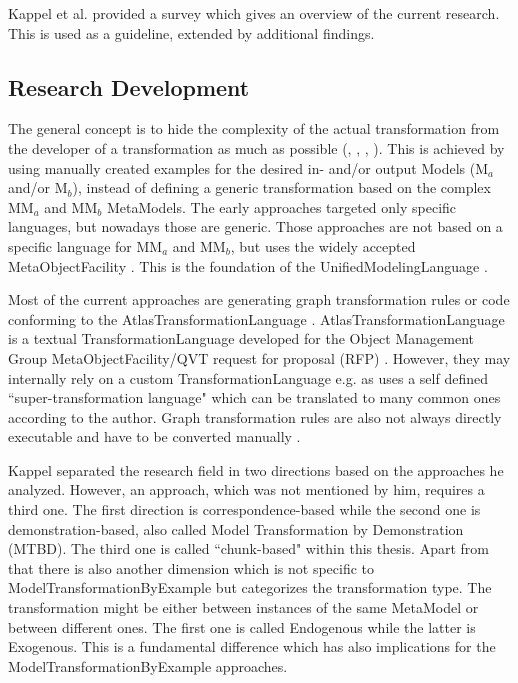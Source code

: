 Kappel et al. \cite{Kappel2012} provided a survey which gives an overview of the current research. This is used as a guideline, extended by additional findings.

\subsection{Research Development}


The general concept is to hide the complexity of the actual transformation from the developer of a transformation as much as possible (\cite{Zloof1977}, \cite{Island1987}, \cite{Krishnamurthi2000}, \cite{Kappel2012}). This is achieved by using manually created examples for the desired in- and/or output \glspl{Model} (M$_a$ and/or M$_b$), instead of defining a generic transformation based on the complex MM$_a$ and MM$_b$ \glspl{MetaModel}. The early approaches targeted only specific languages, but nowadays those are generic. Those approaches are not based on a specific language for MM$_a$ and MM$_b$, but uses the widely accepted \gls{MetaObjectFacility} \cite{ObjectManagementGroup2013}. This is the foundation of the \gls{UnifiedModelingLanguage} \cite{umlInfra}. 

Most of the current approaches are generating graph transformation rules or code conforming to the \gls{AtlasTransformationLanguage} \cite{Kappel2012}. \Gls{AtlasTransformationLanguage} is a textual \gls{TransformationLanguage} developed for the Object Management Group \gls{MetaObjectFacility}/QVT request for proposal (RFP) \cite{EclipseFoundation2013}. However, they may internally rely on a custom \gls{TransformationLanguage} e.g. as \cite{IvanGarcia-Magarino2009} uses a self defined ``super-transformation language" which can be translated to many common ones according to the author. Graph transformation rules are also not always directly executable and have to be converted manually \cite{Varro2007}.

Kappel \cite{Kappel2012} separated the research field in two directions based on the approaches he analyzed. However, an approach, which was not mentioned by him, requires a third one. The first direction is correspondence-based while the second one is demonstration-based, also called Model Transformation by Demonstration (MTBD). The third one is called ``chunk-based" within this thesis. Apart from that there is also another dimension which is not specific to \gls{ModelTransformationByExample} but categorizes the transformation type. The transformation might be either between instances of the same \gls{MetaModel} or between different ones. The first one is called \gls{Endogenous} while the latter is \gls{Exogenous}. This is a fundamental difference which has also implications for the \gls{ModelTransformationByExample} approaches. 

